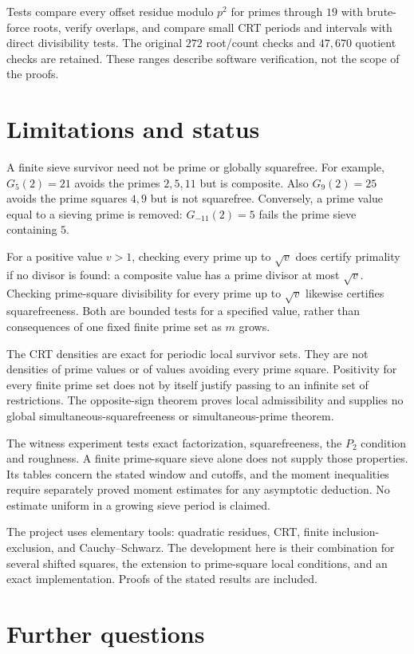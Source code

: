 \documentclass[11pt]{article}
\theoremstyle{definition}
\theoremstyle{remark}
\begin{document}
Tests compare every offset residue modulo $p^2$ for primes through
$19$ with brute-force roots, verify overlaps, and compare small CRT
periods and intervals with direct divisibility tests. The original
$272$ root/count checks and $47{,}670$ quotient checks are retained.
These ranges describe software verification, not the scope of the proofs.

\section{Limitations and status}
A finite sieve survivor need not be prime or globally squarefree.
For example, $G_5(2)=21$ avoids the primes $2,5,11$ but is composite.
Also $G_9(2)=25$ avoids the prime squares $4,9$ but is not squarefree.
Conversely, a prime value equal to a sieving prime is removed:
$G_{-11}(2)=5$ fails the prime sieve containing $5$.

For a positive value $v>1$, checking every prime up to $\sqrt v$
does certify primality if no divisor is found: a composite value has
a prime divisor at most $\sqrt v$. Checking prime-square divisibility
for every prime up to $\sqrt v$ likewise certifies squarefreeness.
Both are bounded tests for a specified value, rather than consequences
of one fixed finite prime set as $m$ grows.

The CRT densities are exact for periodic local survivor sets.
They are not densities of prime values or of values avoiding every
prime square. Positivity for every finite prime set does not by itself
justify passing to an infinite set of restrictions. The opposite-sign
theorem proves local admissibility and supplies no global
simultaneous-squarefreeness or simultaneous-prime theorem.

The witness experiment tests exact factorization, squarefreeness,
the $P_2$ condition and roughness. A finite prime-square sieve alone
does not supply those properties. Its tables concern the stated window
and cutoffs, and the moment inequalities require separately proved
moment estimates for any asymptotic deduction. No estimate uniform
in a growing sieve period is claimed.

The project uses elementary tools: quadratic residues, CRT, finite
inclusion-exclusion, and Cauchy--Schwarz. The development here is their
combination for several shifted squares, the extension to prime-square
local conditions, and an exact implementation. Proofs of the stated
results are included.

\section{Further questions}
\end{document}
